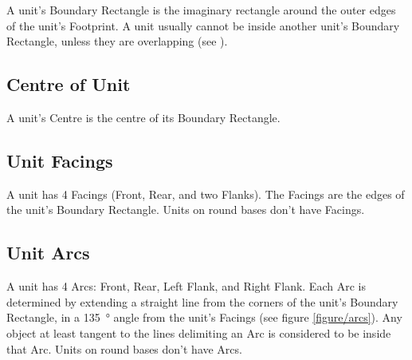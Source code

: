 A unit's Boundary Rectangle is the imaginary rectangle around the outer edges of the unit's Footprint. A unit usually cannot be inside another unit's Boundary Rectangle, unless they are overlapping (see ).

\subsection{Centre of Unit}
\label{centre_of_unit}

A unit's Centre is the centre of its Boundary Rectangle.

\subsection{Unit Facings}
\label{unit_facings}

A unit has 4 Facings (Front, Rear, and two Flanks). The Facings are the edges of the unit's Boundary Rectangle. Units on round bases don't have Facings.

\subsection{Unit Arcs}
\label{unit_arcs}

A unit has 4 Arcs: Front, Rear, Left Flank, and Right Flank. Each Arc is determined by extending a straight line from the corners of the unit's Boundary Rectangle, in a \SI{135}{\degree} angle from the unit's Facings (see figure \ref{figure/arcs}). Any object at least tangent to the lines delimiting an Arc is considered to be inside that Arc. Units on round bases don't have Arcs.

\newcommand{\ARCSa}{a)}
\newcommand{\ARCSb}{b)}
\newcommand{\ARCSc}{c)}

\newcommand{\frontarc}{Front Arc}
\newcommand{\leftflankarc}{%
\begin{minipage}{0.10\unitlength}\begin{center}%
Left Flank Arc%
\end{center}\end{minipage}}
\newcommand{\rightflankarc}{%
\begin{minipage}{0.10\unitlength}\begin{center}%
Right Flank Arc%
\end{center}\end{minipage}}
\newcommand{\reararc}{Rear Arc}
\newcommand{\firstangle}{\SI{90}{\degree}}
\newcommand{\secondangle}{\SI{135}{\degree}}

